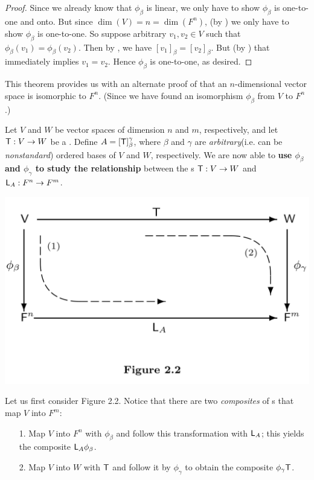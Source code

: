 \begin{proof}
Since we already know that \(\phi_{\beta}\) is linear, we only have to show \(\phi_{\beta}\) is one-to-one and onto.
But since \(\dim(V) = n = \dim(F^n)\), (by ) we only have to show \(\phi_{\beta}\) is one-to-one.
So suppose arbitrary \(v_1, v_2 \in V\) such that \(\phi_{\beta}(v_1) = \phi_{\beta}(v_2)\).
Then by , we have \([v_1]_{\beta} = [v_2]_{\beta}\).
But (by ) that immediately implies \(v_1 = v_2\).
Hence \(\phi_{\beta}\) is one-to-one, as desired.
\end{proof}

\begin{remark} \label{remark 2.4.5}
This theorem provides us with an alternate proof of  that an \(n\)-dimensional vector space is isomorphic to \(F^n\).
(Since we have found an isomorphism \(\phi_{\beta}\) from \(V\) to \(F^n\).)
\end{remark}

Let \(V\) and \(W\) be vector spaces of dimension \(n\) and \(m\), respectively, and let \(\textsf{T} : V \to W\) be a \LTRAN{}.
Define \(A = [\textsf{T}]_{\beta}^{\gamma}\), where \(\beta\) and \(\gamma\) are \emph{arbitrary}(i.e. can be \emph{nonstandard}) ordered bases of \(V\) and \(W\), respectively.
We are now able to \textbf{use \(\phi_{\beta}\) and \(\phi_{\gamma}\) to study the relationship} between the \LTRAN{}s \(\textsf{T} : V \to W\) and
\(\textsf{L}_A: F^n \to F^m\).

\includegraphics[width=16cm]{images/figure-2-2.png}

Let us first consider Figure 2.2.
Notice that there are two \emph{composites} of \LTRAN{}s that map \(V\) into \(F^m\):
\begin{enumerate}
\item[1.] Map \(V\) into \(F^n\) with \(\phi_{\beta}\) and follow this transformation with \(\textsf{L}_A\);
    this yields the composite \(\textsf{L}_A \phi_{\beta}\).
\item[2.] Map \(V\) into \(W\) with \(\textsf{T}\) and follow it by \(\phi_{\gamma}\) to obtain the composite \(\phi_{\gamma} \textsf{T}\).
\end{enumerate}

